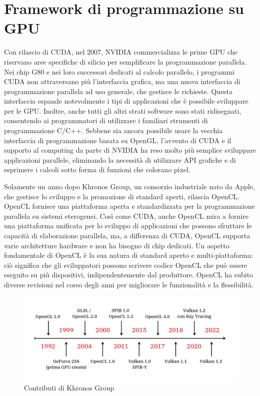 \section[Framework di programmazione su GPU]{Framework di programmazione su GPU}

Con rilascio di \gls{CUDA}, nel 2007, NVIDIA commercializza le prime \gls{GPU} che riservano aree specifiche di silicio per semplificare la programmazione parallela. Nei chip G80 e nei loro successori dedicati al calcolo parallelo, i programmi \gls{CUDA} non attraversano più l'interfaccia grafica, ma una nuova interfaccia di programmazione parallela ad uso generale, che gestisce le richieste. Questa interfaccia espande notevolmente i tipi di applicazioni che è possibile sviluppare per le \gls{GPU}. Inoltre, anche tutti gli altri strati software sono stati ridisegnati, consentendo ai programmatori di utilizzare i familiari strumenti di programmazione C/C++. Sebbene sia ancora possibile usare la vecchia interfaccia di programmazione basata su OpenGL, l'avvento di \gls{CUDA} e il supporto al computing da parte di NVIDIA ha reso molto più semplice sviluppare applicazioni parallele, eliminando la necessità di utilizzare \gls{API} grafiche e di esprimere i calcoli sotto forma di funzioni che colorano pixel.

Solamente un anno dopo Khronos Group, un consorzio industriale nato da Apple, che gestisce lo sviluppo e la promozione di standard aperti, rilascia OpenCL. OpenCL fornisce una piattaforma aperta e standardizzata per la programmazione parallela su sistemi eterogenei. Così come \gls{CUDA}, anche OpenCL mira a fornire una piattaforma unificata per lo sviluppo di applicazioni che possono sfruttare le capacità di elaborazione parallela, ma, a differenza di \gls{CUDA}, OpenCL supporta varie architetture hardware e non ha bisogno di chip dedicati. Un aspetto fondamentale di OpenCL è la sua natura di standard aperto e multi-piattaforma: ciò significa che gli sviluppatori possono scrivere codice OpenCL che può essere eseguito su più dispositivi, indipendentemente dal produttore. OpenCL ha subito diverse revisioni nel corso degli anni per migliorare le funzionalità e la flessibilità.

\begin{figure}[ht]
    \centering
    \includegraphics[width=1\linewidth]{images/chapter2/vulkan_history.png}
    \caption{Contributi di Khronos Group}
    \label{fig:vulkan_history}
\end{figure}

